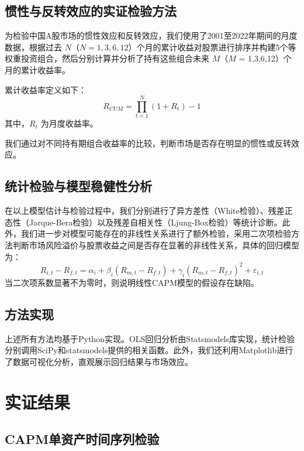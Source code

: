 \documentclass[12pt, a4paper]{article}
\begin{document}
\subsection{惯性与反转效应的实证检验方法}

为检验中国A股市场的惯性效应和反转效应，我们使用了2001至2022年期间的月度数据，根据过去 $N$（$N=1,3,6,12$）个月的累计收益对股票进行排序并构建5个等权重投资组合，然后分别计算并分析了持有这些组合未来 $M$（$M$ = 1,3,6,12）个月的累计收益率。

累计收益率定义如下：
\begin{equation}
R_{CUM} = \prod_{t=1}^{N}(1+R_t) - 1
\end{equation}
其中，$R_t$ 为月度收益率。

我们通过对不同持有期组合收益率的比较，判断市场是否存在明显的惯性或反转效应。

\subsection{统计检验与模型稳健性分析}

在以上模型估计与检验过程中，我们分别进行了异方差性（White检验）、残差正态性（Jarque-Bera检验）以及残差自相关性（Ljung-Box检验）等统计诊断。此外，我们进一步对模型可能存在的非线性关系进行了额外检验，采用二次项检验方法判断市场风险溢价与股票收益之间是否存在显著的非线性关系，具体的回归模型为：
\begin{equation}
R_{i,t}-R_{f,t} = \alpha_i + \beta_i(R_{m,t}-R_{f,t}) + \gamma_i(R_{m,t}-R_{f,t})^2 + \varepsilon_{i,t}
\end{equation}
当二次项系数显著不为零时，则说明线性CAPM模型的假设存在缺陷。

\subsection{方法实现}

上述所有方法均基于Python实现。OLS回归分析由Statsmodels库实现，统计检验分别调用SciPy和statsmodels提供的相关函数。此外，我们还利用Matplotlib进行了数据可视化分析，直观展示回归结果与市场效应。

\section{实证结果}

\subsection{CAPM单资产时间序列检验}
\end{document}
